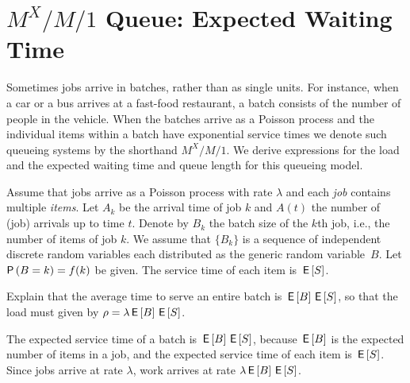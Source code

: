 \section
{$M^X/M/1$ Queue: Expected Waiting Time}
\label{sec:mxm1-queue:-expected}



Sometimes jobs arrive in batches, rather than as single units.
For instance, when a car or a bus arrives at a fast-food restaurant, a batch consists of the number of people in the vehicle.
When the batches arrive as a Poisson process and the individual items within a batch have exponential service times we denote such queueing systems by the shorthand $M^X/M/1$.
We derive expressions for the load and the expected waiting time and queue length for this queueing model. 

Assume that jobs arrive as a Poisson process with rate $\lambda$ and each \emph{job} contains multiple \emph{items}. Let $A_k$ be the arrival time of job $k$ and $A(t)$ the number of (job) arrivals up to time $t$. Denote by $B_k$ the batch size of the $k$th job, i.e., the number of items of job $k$. We assume that $\{B_k\}$ is a sequence of independent discrete random variables each distributed as the generic random variable~$B$. Let $\P{B = k} = f(k)$ be given. %
The service time of each item is $\,\mathsf{E}\left[S\right]$.

\begin{exercise}
  Explain that the average time to serve an entire batch is $\,\mathsf{E}\left[B\right] \,\mathsf{E}\left[S\right]$, so that the load must given by $\rho = \lambda \,\mathsf{E}\left[B\right] \,\mathsf{E}\left[S\right]$.
\begin{solution}
  The expected service time of a batch is $\,\mathsf{E}\left[B\right] \,\mathsf{E}\left[S\right]$, because $\,\mathsf{E}\left[B\right]$ is the expected number of items in a job, and the expected service time of each item is $\,\mathsf{E}\left[S\right]$.  Since jobs arrive at rate $\lambda$, work arrives at rate $\lambda \,\mathsf{E}\left[B\right] \,\mathsf{E}\left[S\right]$. 
\end{solution}
\end{exercise}



